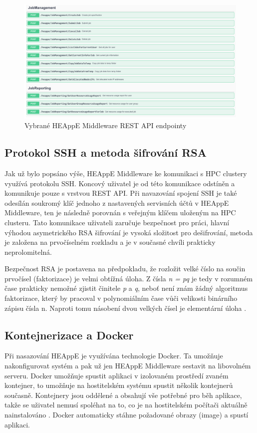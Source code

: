 \begin{figure}
	\centering
	\includegraphics[width=1\textwidth]{Figures/swagger-ui.pdf}
	\caption{Vybrané HEAppE Middleware REST API endpointy}
	\label{fig:swagger}
\end{figure}

\newpage

\subsection{Protokol SSH a metoda šifrování RSA}
Jak už bylo popsáno výše, HEAppE Middleware ke komunikaci s HPC clustery využívá protokolu SSH. Koncový uživatel je od této komunikace odstíněn a komunikuje pouze s vrstvou REST API. Při navazování spojení SSH je také odesílán soukromý klíč jednoho z nastavených servisních účtů v HEAppE Middleware, ten je následně porovnán s veřejným klíčem uloženým na HPC clusteru. Tato komunikace uživateli zaručuje bezpečnost pro práci, hlavní výhodou asymetrického RSA šifrování je vysoká složitost pro dešifrování, metoda je založena na prvočíselném rozkladu a je v současné chvíli prakticky neprolomitelná.

Bezpečnost RSA je postavena na předpokladu, že rozložit velké číslo na součin prvočísel (faktorizace) je velmi obtížná úloha. Z čísla \emph{n = pq} je tedy v rozumném čase prakticky nemožné zjistit činitele \emph{p} a \emph{q}, neboť není znám žádný algoritmus faktorizace, který by pracoval v polynomiálním čase vůči velikosti binárního zápisu čísla n. Naproti tomu násobení dvou velkých čísel je elementární úloha \cite{GqNaOav5DExhzgW6}.

\subsection{Kontejnerizace a Docker}
Při nasazování HEAppE je využívána technologie Docker. Ta umožňuje nakonfigurovat systém a pak už jen HEAppE Middleware sestavit na libovolném serveru. Docker umožňuje spustit aplikaci v izolovaném prostředí zvaném kontejner, to umožňuje na hostitelském systému spustit několik kontejnerů současně. Kontejnery jsou oddělené a obsahují vše potřebné pro běh aplikace, takže se uživatel nemusí spoléhat na to, co je na hostitelském počítači aktuálně nainstalováno \cite{Ued4tuEOQL0cOIeN}. Docker automaticky stáhne požadované obrazy (image) a spustí aplikaci. 

